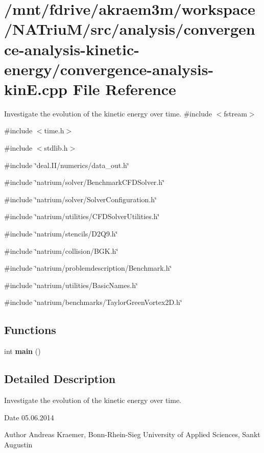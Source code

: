 \hypertarget{convergence-analysis-kinE_8cpp}{
\section{/mnt/fdrive/akraem3m/workspace/NATriuM/src/analysis/convergence-\/analysis-\/kinetic-\/energy/convergence-\/analysis-\/kinE.cpp File Reference}
\label{convergence-analysis-kinE_8cpp}
}


Investigate the evolution of the kinetic energy over time.  
{\ttfamily \#include $<$fstream$>$}\par
{\ttfamily \#include $<$time.h$>$}\par
{\ttfamily \#include $<$stdlib.h$>$}\par
{\ttfamily \#include \char`\"{}deal.II/numerics/data\_\-out.h\char`\"{}}\par
{\ttfamily \#include \char`\"{}natrium/solver/BenchmarkCFDSolver.h\char`\"{}}\par
{\ttfamily \#include \char`\"{}natrium/solver/SolverConfiguration.h\char`\"{}}\par
{\ttfamily \#include \char`\"{}natrium/utilities/CFDSolverUtilities.h\char`\"{}}\par
{\ttfamily \#include \char`\"{}natrium/stencils/D2Q9.h\char`\"{}}\par
{\ttfamily \#include \char`\"{}natrium/collision/BGK.h\char`\"{}}\par
{\ttfamily \#include \char`\"{}natrium/problemdescription/Benchmark.h\char`\"{}}\par
{\ttfamily \#include \char`\"{}natrium/utilities/BasicNames.h\char`\"{}}\par
{\ttfamily \#include \char`\"{}natrium/benchmarks/TaylorGreenVortex2D.h\char`\"{}}\par
\subsection*{Functions}
\begin{DoxyCompactItemize}
\item 
\hypertarget{convergence-analysis-kinE_8cpp_ae66f6b31b5ad750f1fe042a706a4e3d4}{
int {\bfseries main} ()}
\label{convergence-analysis-kinE_8cpp_ae66f6b31b5ad750f1fe042a706a4e3d4}

\end{DoxyCompactItemize}


\subsection{Detailed Description}
Investigate the evolution of the kinetic energy over time. \begin{DoxyDate}{Date}
05.06.2014 
\end{DoxyDate}
\begin{DoxyAuthor}{Author}
Andreas Kraemer, Bonn-\/Rhein-\/Sieg University of Applied Sciences, Sankt Augustin 
\end{DoxyAuthor}
